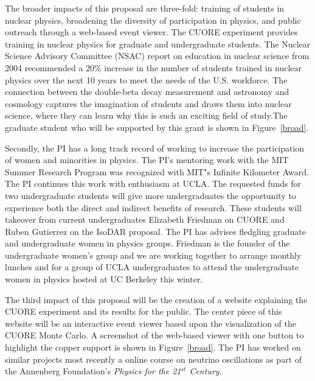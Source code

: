 The broader impacts of this proposal are three-fold: training of students in nuclear physics, broadening the diversity of participation in physics, and public outreach through a web-based event viewer. The CUORE experiment provides training in nuclear physics for graduate and undergraduate students. The Nuclear Science Advisory Committee (NSAC) report on education in nuclear science from 2004 recommended a 20\% increase in the number of students trained in nuclear physics over the next 10 years to meet the needs of the U.S. workforce\cite{nuced}. The connection between the double-beta decay measurement and astronomy and cosmology captures the imagination of students and draws them into nuclear science, where they can learn why this is such an exciting field of study.The graduate student who will be supported by this grant is shown in Figure~\ref{broad}.

Secondly, the PI has a long track record of working to increase the participation of women
and minorities in physics. The PI's mentoring work with the MIT Summer Research Program was recognized with MIT"s Infinite Kilometer Award. The PI continues this work with enthusiasm at UCLA. The requested funds for two undergraduate students will give more undergraduates the opportunity to experience both the direct and indirect benefits of research. These students will takeover from current undergraduates Elizabeth Friedman on CUORE and Ruben Gutierrez on the IsoDAR proposal. The PI has advises fledgling graduate and undergraduate women in physics groups. Friedman is the founder of the undergraduate women's group and we are working together to arrange monthly lunches and for a group of UCLA undergraduates to attend the undergraduate women in physics hosted at UC Berkeley this winter.

The third impact of this proposal will be the creation of a website explaining the CUORE experiment and its results for the public. The center piece of this website will be an interactive event viewer based upon the visualization of the CUORE Monte Carlo. A screenshot of the web-based viewer with one button to highlight the copper support is shown in Figure~\ref{broad}. The PI has worked on similar projects most recently a online course on neutrino oscillations as part of the Annenberg Foundation's \textit{Physics for the 21$^{st}$ Century}. 

